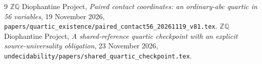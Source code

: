 \documentclass[11pt]{article}
\newcommand{\Q}{\mathbb Q}\newcommand{\Z}{\mathbb Z}
\begin{document}
\begin{thebibliography}{9}
 \(\Z\Q\) Diophantine Project,
\emph{Paired contact coordinates: an ordinary-abc quartic in 56 variables},
19 November 2026,
\nolinkurl{papers/quartic_existence/paired_contact56_20261119_v81.tex}.
 \(\Z\Q\) Diophantine Project,
\emph{A shared-reference quartic checkpoint with an explicit
source-universality obligation}, 23 November 2026,
\nolinkurl{undecidability/papers/shared_quartic_checkpoint.tex}.
\end{thebibliography}
\end{document}
